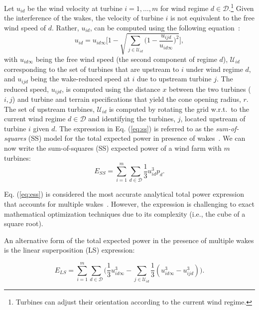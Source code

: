 \documentclass[preprint,12pt]{elsarticle}
\begin{document}
Let $u_{id}$ be the wind velocity at turbine $i = 1,\ldots, m$ for wind regime $d\in\mathcal{D}$.\footnote{Turbines can adjust their orientation according to the current wind 
regime.}  Given the interference of the wakes, the velocity of turbine $i$ is not equivalent to the free wind speed of $d$.
Rather, $u_{id}$, can be computed using the following equation~\cite{Zhang2014}:
\begin{equation}
u_{id} = u_{id\infty} \Bigg[1 - \sqrt{\sum_{j\in\mathcal{U}_{id}} \bigg( 1-\frac{u_{ijd}}{u_{id\infty}} \bigg)^2}  \Bigg], \label{eq:ss}
\end{equation} with $u_{id\infty}$ being the free wind speed (the second component of regime $d$), $\mathcal{U}_{id}$ corresponding to the set of turbines  that are upstream to $i$ 
under wind regime $d$, and $u_{ijd}$ being the wake-reduced speed at $i$ due to upstream turbine $j$. 
The reduced speed, $u_{ijd}$, is computed using the distance $x$ between the two turbines ($i,j$)  and turbine and terrain specifications that yield the cone opening radius, $r$. The set of upstream turbines, $\mathcal{U}_{id}$ is computed  
by rotating the grid w.r.t.\ to the current wind regime $d \in \mathcal{D}$ and identifying the turbines, $j$, located upstream of turbine $i$ given $d$. The expression in Eq. (\ref{eq:ss}) is referred to as the \emph{sum-of-squares} (SS) model for 
the total expected power in presence of wakes~\cite{Zhang2014}.  We can now write 
the sum-of-squares (SS) expected power of a wind farm with $m$ turbines:
\begin{equation}
  E_{SS} = \sum_{i=1}^m \sum_{d\in\mathcal{D}} \frac{1}{3} u_{id}^3p_d.\label{eq:ess}
\end{equation}

  Eq. (\ref{eq:ess}) is considered the most accurate analytical total power expression that accounts for multiple wakes~\cite{jensen1983note}. 
  However, the expression is challenging to exact mathematical optimization techniques due to its complexity (i.e., the cube of a square root).

An alternative 
form of the total expected power in the presence of multiple wakes is the linear superposition (LS) expression:

\begin{equation} \label{eq:ls}
E_{LS} = \sum_{i=1}^m \sum_{d\in\mathcal{D}} \Bigg(\frac{1}{3}u_{id\infty}^3 -\sum_{j\in\mathcal{U}_{id}} \frac{1}{3}(u_{id\infty}^3 - u_{ijd}^3)\Bigg).
\end{equation}
\end{document}
